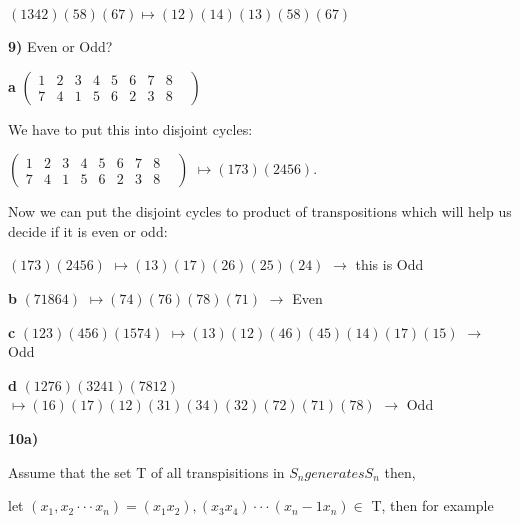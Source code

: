 \documentclass{article}
\begin{document}
\medskip

$(1342)(58)(67) 	\mapsto(12)(14)(13)(58)(67)$


\bigskip

\textbf{9)} Even or Odd?


\medskip

\hspace{.2in}\textbf{a}
$(\begin{smallmatrix}
1 & 2 & 3 & 4 & 5 & 6 & 7 & 8 & \\
7 & 4 & 1 & 5 & 6 & 2 & 3 & 8 &
\end{smallmatrix})$

\medskip

We have to put this into disjoint cycles:

\begin{center}
$(\begin{smallmatrix}
1 & 2 & 3 & 4 & 5 & 6 & 7 & 8 & \\
7 & 4 & 1 & 5 & 6 & 2 & 3 & 8 &
\end{smallmatrix})$		$\mapsto(173)(2456)$.
\end{center}

\medskip

Now we can put the disjoint cycles to product of transpositions which will help us decide if it is even or odd:

\medskip
$(173)(2456)$		$\mapsto(13)(17)(26)(25)(24)$   $\longrightarrow$ this is Odd


\medskip
\bigskip


\hspace{.2in}\textbf{b} \hspace{.1in} $(71864)$		$\mapsto(74)(76)(78)(71)$	$\longrightarrow$  Even

\medskip

\hspace{.2in}\textbf{c} \hspace{.1in} $(123)(456)(1574)$	 $\mapsto(13)(12)(46)(45)(14)(17)(15)$ 		$\longrightarrow$ Odd

\medskip

\hspace{.2in}\textbf{d} \hspace{.1in}  $(1276)(3241)(7812)$ 		$\mapsto (16)(17)(12)(31)(34)(32)(72)(71)(78)$		$\longrightarrow$ Odd

\medskip
 
\textbf{10a)}

Assume that the set T of all transpisitions in $S_n generates S_n$ then,

let $(x_1,x_2 \cdot \cdot \cdot x_n)=(x_1 x_2), (x_3 x_4) \cdot \cdot \cdot (x_n-1 x_n) \in$ T, 
then for example
\end{document}
